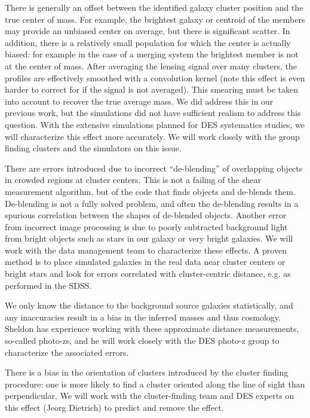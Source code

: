 \documentclass[12pt]{article}
\begin{document}
There is generally an offset between the identified galaxy cluster position and
the true center of mass. For example, the brightest galaxy or centroid of the
members may provide an unbiased center on average, but there is significant
scatter.  In addition, there is a relatively small population for which the
center is actually biased: for example in the case of a merging system the
brightest member is not at the center of mass. After averaging the lensing
signal over many clusters, the profiles are effectively smoothed with a
convolution kernel (note this effect is even harder to correct for if the
signal is not averaged). This smearing must be taken into account to recover
the true average mass.  We did address this in our previous
work\cite{JohnstonLensing07}, but the simulations did not have sufficient
realism to address this question.  With the extensive simulations planned for
DES systematics studies, we will characterize this effect more accurately.  We
will work closely with the group finding clusters and the simulators on this
issue.

There are errors introduced due to incorrect ``de-blending'' of overlapping
objects in crowded regions at cluster centers. This is not a failing of the
shear measurement algorithm, but of the code that finds objects and de-blends
them. De-blending is not a fully solved problem, and often the de-blending
results in a spurious correlation between the shapes of de-blended objects.
Another error from incorrect image processing is due to poorly subtracted
background light from bright objects such as stars in our galaxy or very bright
galaxies.  We will work with the data management team to characterize these
effects.  A proven method is to place simulated galaxies in the real data near
cluster centers or bright stars and look for errors correlated with
cluster-centric distance, e.g. as performed in the
SDSS\cite{MandelbaumSystematics05}.

We only know the distance to the background source galaxies statistically, and
any inaccuracies result in a bias in the inferred masses and thus cosmology.
Sheldon has experience working with these approximate distance measurements,
so-called photo-zs\cite{SheldonPhotozDR8}, and he will work closely with the
DES photo-z group to characterize the associated errors.  

There is a bias in the orientation of clusters introduced by the cluster
finding procedure: one is more likely to find a cluster oriented along the line
of sight than perpendicular.  We will work with the cluster-finding team and
DES experts on this effect (Jeorg Dietrich) to predict and remove the effect.
\end{document}
